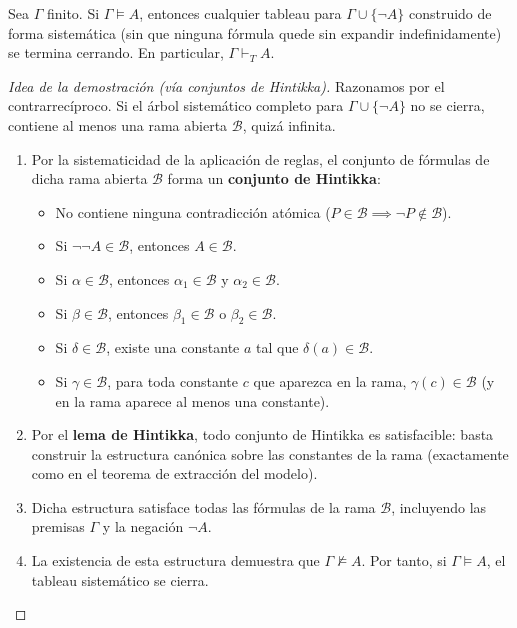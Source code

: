 \begin{theorem}
Sea $\Gamma$ finito. Si $\Gamma \models A$, entonces cualquier tableau
para $\Gamma \cup \{\neg A\}$ construido de forma sistemática (sin que
ninguna fórmula quede sin expandir indefinidamente) se termina
cerrando. En particular, $\Gamma \vdash_T A$.  
\end{theorem}

\begin{proof}[Idea de la demostración (vía conjuntos de Hintikka)]
Razonamos por el contrarrecíproco. Si el árbol sistemático completo para $\Gamma \cup \{\neg A\}$ no se cierra, contiene al menos una rama abierta $\mathcal{B}$, quizá infinita. 
\begin{enumerate}
    \item Por la sistematicidad de la aplicación de reglas, el conjunto de fórmulas de dicha rama abierta $\mathcal{B}$ forma un \textbf{conjunto de Hintikka}:
    \begin{itemize}
        \item No contiene ninguna contradicción atómica ($P \in \mathcal{B} \implies \neg P \notin \mathcal{B}$).
        \item Si $\neg\neg A \in \mathcal{B}$, entonces $A \in \mathcal{B}$.
        \item Si $\alpha \in \mathcal{B}$, entonces $\alpha_1 \in \mathcal{B}$ y $\alpha_2 \in \mathcal{B}$.
        \item Si $\beta \in \mathcal{B}$, entonces $\beta_1 \in \mathcal{B}$ o $\beta_2 \in \mathcal{B}$.
        \item Si $\delta \in \mathcal{B}$, existe una constante $a$ tal que $\delta(a) \in \mathcal{B}$.
        \item Si $\gamma \in \mathcal{B}$, para toda constante $c$ que aparezca en la rama, $\gamma(c) \in \mathcal{B}$ (y en la rama aparece al menos una constante).
    \end{itemize}
    \item Por el \textbf{lema de Hintikka}, todo conjunto de Hintikka es satisfacible: basta construir la estructura canónica sobre las constantes de la rama (exactamente como en el teorema de extracción del modelo).
    \item Dicha estructura satisface todas las fórmulas de la rama $\mathcal{B}$, incluyendo las premisas $\Gamma$ y la negación $\neg A$.
    \item La existencia de esta estructura demuestra que $\Gamma \not\models A$. Por tanto, si $\Gamma \models A$, el tableau sistemático se cierra. \qedhere
\end{enumerate}
\end{proof}

